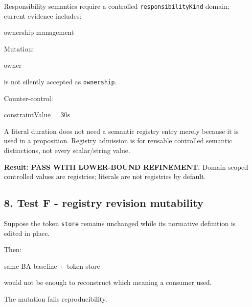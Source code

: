 \documentclass[
  10pt,
  a4paper,
]{article}
\newenvironment{Shaded}{}{}
\newcommand{\NormalTok}[1]{#1}
\begin{document}
Responsibility semantics require a controlled
\texttt{responsibilityKind} domain; current evidence includes:

\begin{Shaded}
\begin{Highlighting}[]
\NormalTok{ownership}
\NormalTok{management}
\end{Highlighting}
\end{Shaded}

Mutation:

\begin{Shaded}
\begin{Highlighting}[]
\NormalTok{owner}
\end{Highlighting}
\end{Shaded}

is not silently accepted as \texttt{ownership}.

Counter-control:

\begin{Shaded}
\begin{Highlighting}[]
\NormalTok{constraintValue = 30s}
\end{Highlighting}
\end{Shaded}

A literal duration does not need a semantic registry entry merely
because it is used in a proposition. Registry admission is for reusable
controlled semantic distinctions, not every scalar/string value.

\textbf{Result: PASS WITH LOWER-BOUND REFINEMENT.} Domain-scoped
controlled values are registries; literals are not registries by
default.

\subsection{8. Test F - registry revision
mutability}\label{test-f---registry-revision-mutability}

Suppose the token \texttt{store} remains unchanged while its normative
definition is edited in place.

Then:

\begin{Shaded}
\begin{Highlighting}[]
\NormalTok{same BA baseline + token store}
\end{Highlighting}
\end{Shaded}

would not be enough to reconstruct which meaning a consumer used.

The mutation fails reproducibility.
\end{document}
